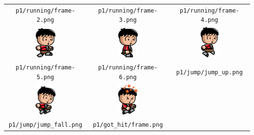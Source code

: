 {\begin{center}
\begin{tabular}{c c c}
	\texttt{\footnotesize p1/running/frame-2.png} & \texttt{\footnotesize p1/running/frame-3.png} & \texttt{\footnotesize p1/running/frame-4.png} \\
	\includegraphics[width=3em]{sprites/anime/p1/running/frame-5.png} & \includegraphics[width=3em]{sprites/anime/p1/running/frame-6.png} & \includegraphics[width=3em]{sprites/anime/p1/jump/jump_up.png} \\
	\texttt{\footnotesize p1/running/frame-5.png} & \texttt{\footnotesize p1/running/frame-6.png} & \texttt{\footnotesize p1/jump/jump\_up.png} \\
	\includegraphics[width=3em]{sprites/anime/p1/jump/jump_fall.png} & \includegraphics[width=3em]{sprites/anime/p1/got_hit/frame.png} & \\
	\texttt{\footnotesize p1/jump/jump\_fall.png} & \texttt{\footnotesize p1/got\_hit/frame.png} & \\
\end{tabular}
\end{center}
}

